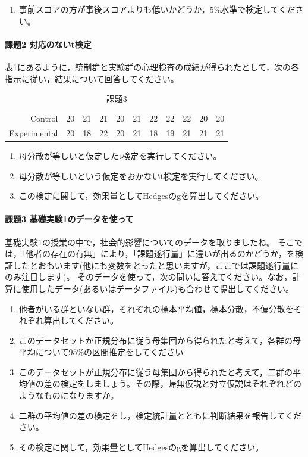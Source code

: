 \documentclass{ltjsbook}
\begin{document}
\begin{enumerate}
	\item 事前スコアの方が事後スコアよりも低いかどうか，5\%水準で検定してください。
\end{enumerate}

\paragraph{課題2 対応のないt検定}
表\ref{exe:20_3}にあるように，統制群と実験群の心理検査の成績が得られたとして，次の各指示に従い，結果について回答してください。
\begin{table}[ht]
	\centering
	\caption{課題3}
	\label{exe:20_3}
	\begin{tabular}{rrrrrrrrrrr}
		\hline
		Control      & 20 & 21 & 21 & 20 & 21 & 22 & 22 & 22 & 20 & 20 \\
		Experimental & 20 & 18 & 22 & 20 & 21 & 18 & 19 & 21 & 21 & 21 \\
		\hline
	\end{tabular}
\end{table}

\begin{enumerate}
	\item 母分散が等しいと仮定したt検定を実行してください。
	\item 母分散が等しいという仮定をおかないt検定を実行してください。
	\item この検定に関して，効果量としてHedgesのgを算出してください。
\end{enumerate}

\paragraph{課題3 基礎実験1のデータを使って}
基礎実験1の授業の中で，社会的影響についてのデータを取りましたね。
そこでは，「他者の存在の有無」により，「課題遂行量」に違いが出るのかどうか，を検証したとおもいます(他にも変数をとったと思いますが，ここでは課題遂行量にのみ注目します)。
そのデータを使って，次の問いに答えてください。なお，計算に使用したデータ(あるいはデータファイル)も合わせて提出してください。
\begin{enumerate}
	\item 他者がいる群といない群，それぞれの標本平均値，標本分散，不偏分散をそれぞれ算出してください。
	\item このデータセットが正規分布に従う母集団から得られたと考えて，各群の母平均について95\%の区間推定をしてください
	\item このデータセットが正規分布に従う母集団から得られたと考えて，二群の平均値の差の検定をしましょう。その際，帰無仮説と対立仮説はそれぞれどのようなものになりますか。
	\item 二群の平均値の差の検定をし，検定統計量とともに判断結果を報告してください。
	\item その検定に関して，効果量としてHedgesのgを算出してください。
\end{enumerate}
\end{document}
